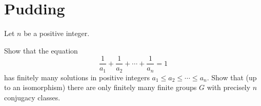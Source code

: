 \documentclass[answers]{exam}
\begin{document}
\section*{Pudding}
\begin{questions}
\question%
Let $n$ be a positive integer.
\begin{subparts}
\subpart Show that the equation \[
	\frac{1}{a_{1}}+\frac{1}{a_{2}}+\cdots+\frac{1}{a_{n}}=1
\] has finitely many solutions in positive integers $a_{1} \leqslant a_{2} \leqslant \cdots \leqslant a_{n}$.
\subpart Show that (up to an isomorphism) there are only finitely many finite groups $G$ with precisely $n$ conjugacy classes.
\end{subparts}

\end{questions}
\end{document}
